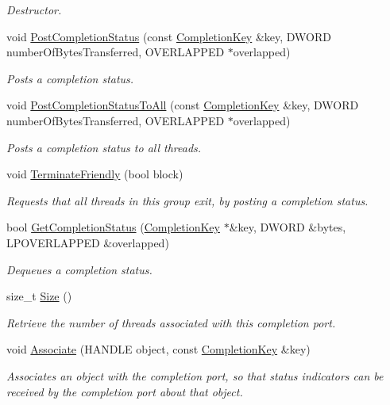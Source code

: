 \begin{DoxyCompactItemize}
\begin{DoxyCompactList}\small\item\em Destructor. \item\end{DoxyCompactList}\item 
void \hyperlink{class_completion_port_a7bc61cb11ea8a3ea8cc0a9672c13dd83}{PostCompletionStatus} (const \hyperlink{class_completion_key}{CompletionKey} \&key, DWORD numberOfBytesTransferred, OVERLAPPED $\ast$overlapped)
\begin{DoxyCompactList}\small\item\em Posts a completion status. \item\end{DoxyCompactList}\item 
void \hyperlink{class_completion_port_adbc0ecf9dc6bd7446bb3cce1b1e1de29}{PostCompletionStatusToAll} (const \hyperlink{class_completion_key}{CompletionKey} \&key, DWORD numberOfBytesTransferred, OVERLAPPED $\ast$overlapped)
\begin{DoxyCompactList}\small\item\em Posts a completion status to all threads. \item\end{DoxyCompactList}\item 
void \hyperlink{class_completion_port_a02bf5e9c71e6da01d30db9c693dfd2e4}{TerminateFriendly} (bool block)
\begin{DoxyCompactList}\small\item\em Requests that all threads in this group exit, by posting a completion status. \item\end{DoxyCompactList}\item 
bool \hyperlink{class_completion_port_a70cd70659f442faf73db0716c37c0b6a}{GetCompletionStatus} (\hyperlink{class_completion_key}{CompletionKey} $\ast$\&key, DWORD \&bytes, LPOVERLAPPED \&overlapped)
\begin{DoxyCompactList}\small\item\em Dequeues a completion status. \item\end{DoxyCompactList}\item 
size\_\-t \hyperlink{class_completion_port_abe0188f76091a2ec11c378af8d47066e}{Size} ()
\begin{DoxyCompactList}\small\item\em Retrieve the number of threads associated with this completion port. \item\end{DoxyCompactList}\item 
void \hyperlink{class_completion_port_a446fdec82ca0a639a877d0172084f540}{Associate} (HANDLE object, const \hyperlink{class_completion_key}{CompletionKey} \&key)
\begin{DoxyCompactList}\small\item\em Associates an object with the completion port, so that status indicators can be received by the completion port about that object. \item\end{DoxyCompactList}\end{DoxyCompactItemize}
